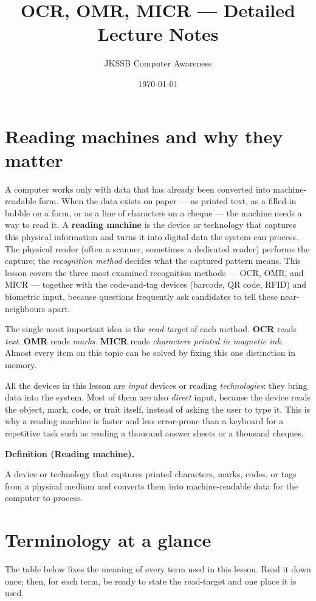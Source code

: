 \documentclass[11pt]{article}
\title{OCR, OMR, MICR --- Detailed Lecture Notes}
\author{JKSSB Computer Awareness}
\date{\today}
\newenvironment{definitionbox}[1]{%
  \par\noindent\textbf{Definition (#1).}\ \itshape
}{\par\vspace{0.3em}}
\begin{document}
\maketitle

\section{Reading machines and why they matter}
A computer works only with data that has already been converted into
machine-readable form. When the data exists on paper --- as printed text, as
a filled-in bubble on a form, or as a line of characters on a cheque --- the
machine needs a way to read it. A \textbf{reading machine} is the device or
technology that captures this physical information and turns it into digital
data the system can process. The physical reader (often a scanner, sometimes
a dedicated reader) performs the capture; the \emph{recognition method}
decides what the captured pattern means. This lesson covers the three most
examined recognition methods --- OCR, OMR, and MICR --- together with the
code-and-tag devices (barcode, QR code, RFID) and biometric input, because
questions frequently ask candidates to tell these near-neighbours apart.

The single most important idea is the \emph{read-target} of each method.
\textbf{OCR} reads \emph{text}. \textbf{OMR} reads \emph{marks}.
\textbf{MICR} reads \emph{characters printed in magnetic ink}. Almost every
item on this topic can be solved by fixing this one distinction in memory.

All the devices in this lesson are \emph{input} devices or reading
\emph{technologies}: they bring data into the system. Most of them are also
\emph{direct} input, because the device reads the object, mark, code, or
trait itself, instead of asking the user to type it. This is why a reading
machine is faster and less error-prone than a keyboard for a repetitive task
such as reading a thousand answer sheets or a thousand cheques.

\begin{definitionbox}{Reading machine}
A device or technology that captures printed characters, marks, codes, or
tags from a physical medium and converts them into machine-readable data for
the computer to process.
\end{definitionbox}

\section{Terminology at a glance}
The table below fixes the meaning of every term used in this lesson. Read it
down once; then, for each term, be ready to state the read-target and one
place it is used.
\end{document}

